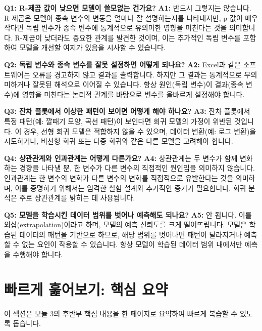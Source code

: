 \documentclass[11pt,a4paper]{book}
\theoremstyle{definition}
\begin{document}
\begin{tcolorbox}[colback=lightblue,colframe=darkblue,title={자주 묻는 질문}]
\textbf{Q1: R-제곱 값이 낮으면 모델이 쓸모없는 건가요?}
\textbf{A1:} 반드시 그렇지는 않습니다. R-제곱은 모델이 종속 변수의 변동을 얼마나 잘 설명하는지를 나타내지만, p-값이 매우 작다면 독립 변수가 종속 변수에 통계적으로 유의미한 영향을 미친다는 것을 의미합니다. R-제곱이 낮더라도 중요한 관계를 발견한 것이며, 이는 추가적인 독립 변수를 포함하여 모델을 개선할 여지가 있음을 시사할 수 있습니다.

\textbf{Q2: 독립 변수와 종속 변수를 잘못 설정하면 어떻게 되나요?}
\textbf{A2:} Excel과 같은 소프트웨어는 오류를 경고하지 않고 결과를 출력합니다. 하지만 그 결과는 통계적으로 무의미하거나 잘못된 해석으로 이어질 수 있습니다. 항상 원인(독립 변수)이 결과(종속 변수)에 영향을 미친다는 논리적 관계를 바탕으로 변수를 올바르게 설정해야 합니다.

\textbf{Q3: 잔차 플롯에서 이상한 패턴이 보이면 어떻게 해야 하나요?}
\textbf{A3:} 잔차 플롯에서 특정 패턴(예: 깔때기 모양, 곡선 패턴)이 보인다면 회귀 모델의 가정이 위반된 것입니다. 이 경우, 선형 회귀 모델은 적합하지 않을 수 있으며, 데이터 변환(예: 로그 변환)을 시도하거나, 비선형 회귀 또는 다중 회귀와 같은 다른 모델을 고려해야 합니다.

\textbf{Q4: 상관관계와 인과관계는 어떻게 다른가요?}
\textbf{A4:} 상관관계는 두 변수가 함께 변화하는 경향을 나타낼 뿐, 한 변수가 다른 변수의 직접적인 원인임을 의미하지 않습니다. 인과관계는 한 변수의 변화가 다른 변수의 변화를 직접적으로 유발한다는 것을 의미하며, 이를 증명하기 위해서는 엄격한 실험 설계와 추가적인 증거가 필요합니다. 회귀 분석은 주로 상관관계를 밝히는 데 사용됩니다.

\textbf{Q5: 모델을 학습시킨 데이터 범위를 벗어나 예측해도 되나요?}
\textbf{A5:} 안 됩니다. 이를 외삽(extrapolation)이라고 하며, 모델의 예측 신뢰도를 크게 떨어뜨립니다. 모델은 학습된 데이터의 패턴을 기반으로 하므로, 해당 범위를 벗어나면 패턴이 달라지거나 예측할 수 없는 요인이 작용할 수 있습니다. 항상 모델이 학습된 데이터 범위 내에서만 예측을 수행해야 합니다.
\end{tcolorbox}


\section{빠르게 훑어보기: 핵심 요약}
이 섹션은 모듈 3의 후반부 핵심 내용을 한 페이지로 요약하여 빠르게 복습할 수 있도록 돕습니다.
\end{document}
